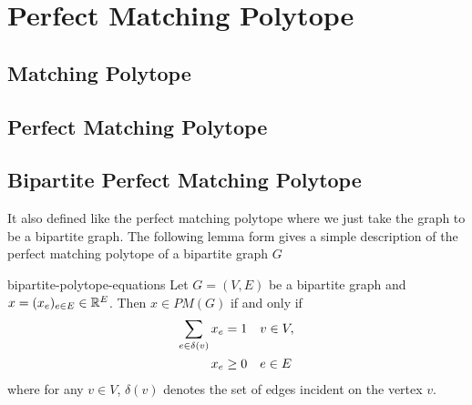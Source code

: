 \chapter{Perfect Matching Polytope}
\section{Matching Polytope}
\section{Perfect Matching Polytope}
\section{Bipartite Perfect Matching Polytope}
It also defined like the perfect matching polytope where we just take the graph to be a bipartite graph. The following lemma form \cite{LovaszPlummer_1986_BOOK} gives a simple description of the perfect matching polytope of a bipartite graph $G$ 
\begin{Theorem}{\cite{LovaszPlummer_1986_BOOK}}{bipartite-polytope-equations}
	Let $G=(V,E)$ be a bipartite graph and $x=(x_e)_{e\in E}\in \mathbb{R}^E$. Then $x\in PM(G)$ if and only if \begin{align*}
		\sum_{e\in\delta(v)}x_e=1 &\quad v\in V,\\
		x_e\geq 0&\quad e\in E
	\end{align*}where for any $v\in V$, $\delta(v)$ denotes the set of edges incident on the vertex $v$.
\end{Theorem}
